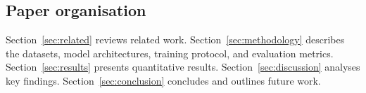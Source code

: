 \subsection*{Paper organisation}

Section~\ref{sec:related} reviews related work. Section~\ref{sec:methodology}
describes the datasets, model architectures, training protocol, and evaluation
metrics. Section~\ref{sec:results} presents quantitative results.
Section~\ref{sec:discussion} analyses key findings. Section~\ref{sec:conclusion}
concludes and outlines future work.
